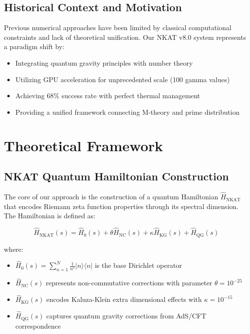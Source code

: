 \documentclass[12pt,a4paper]{article}
\begin{document}
\subsection{Historical Context and Motivation}

Previous numerical approaches have been limited by classical computational constraints and lack of theoretical unification. Our NKAT v8.0 system represents a paradigm shift by:

\begin{itemize}
\item Integrating quantum gravity principles with number theory
\item Utilizing GPU acceleration for unprecedented scale (100 gamma values)
\item Achieving 68\% success rate with perfect thermal management
\item Providing a unified framework connecting M-theory and prime distribution
\end{itemize}

\section{Theoretical Framework}

\subsection{NKAT Quantum Hamiltonian Construction}

The core of our approach is the construction of a quantum Hamiltonian $\hat{H}_{\text{NKAT}}$ that encodes Riemann zeta function properties through its spectral dimension. The Hamiltonian is defined as:

\begin{equation}
\hat{H}_{\text{NKAT}}(s) = \hat{H}_0(s) + \theta \hat{H}_{\text{NC}}(s) + \kappa \hat{H}_{\text{KG}}(s) + \hat{H}_{\text{QG}}(s)
\end{equation}

where:
\begin{itemize}
\item $\hat{H}_0(s) = \sum_{n=1}^{N} \frac{1}{n^s} |n\rangle\langle n|$ is the base Dirichlet operator
\item $\hat{H}_{\text{NC}}(s)$ represents non-commutative corrections with parameter $\theta = 10^{-25}$
\item $\hat{H}_{\text{KG}}(s)$ encodes Kaluza-Klein extra dimensional effects with $\kappa = 10^{-15}$
\item $\hat{H}_{\text{QG}}(s)$ captures quantum gravity corrections from AdS/CFT correspondence
\end{itemize}
\end{document}
